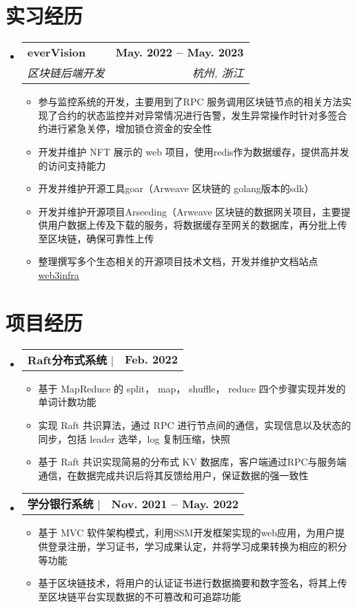 \documentclass[letterpaper,11pt]{ctexart}
\makeatletter
\newcommand{\resumeItem}[1]{
  \item\small{
    {#1 \vspace{-2pt}}
  }
}
\newcommand{\resumeSubheading}[4]{
  \vspace{-2pt}\item
    \begin{tabular*}{1.0\textwidth}[t]{l@{\extracolsep{\fill}}r}
      \textbf{#1} & \textbf{\small #2} \\
      \textit{\small#3} & \textit{\small #4} \\
    \end{tabular*}\vspace{-7pt}
}
\newcommand{\resumeProjectHeading}[2]{
    \item
    \begin{tabular*}{1.001\textwidth}{l@{\extracolsep{\fill}}r}
      \small#1 & \textbf{\small #2}\\
    \end{tabular*}\vspace{-7pt}
}
\newcommand{\resumeSubHeadingListStart}{\begin{itemize}[leftmargin=0.0in, label={}]}
\newcommand{\resumeSubHeadingListEnd}{\end{itemize}}
\newcommand{\resumeItemListStart}{\begin{itemize}}
\newcommand{\resumeItemListEnd}{\end{itemize}\vspace{-5pt}}
\makeatother
\begin{document}
\section{实习经历}
  \resumeSubHeadingListStart

    \resumeSubheading
      {everVision}{May. 2022 -- May. 2023}
      {区块链后端开发}{杭州, 浙江}
      \resumeItemListStart
        \resumeItem{参与监控系统的开发，主要用到了RPC 服务调用区块链节点的相关方法实现了合约的状态监控并对异常情况进行告警，发生异常操作时针对多签合约进行紧急关停，增加锁仓资金的安全性}
        \resumeItem{开发并维护 NFT 展示的 web 项目，使用redis作为数据缓存，提供高并发的访问支持能力}
        \resumeItem{开发并维护开源工具goar（Arweave 区块链的 golang版本的sdk）}
        \resumeItem{开发并维护开源项目Arseeding（Arweave 区块链的数据网关项目，主要提供用户数据上传及下载的服务，将数据缓存至网关的数据库，再分批上传至区块链，确保可靠性上传}
        \resumeItem{整理撰写多个生态相关的开源项目技术文档，开发并维护文档站点 \href{https://web3infra.dev/}{\underline{web3infra}}}
      \resumeItemListEnd

    
  \resumeSubHeadingListEnd
\vspace{-16pt}

\section{项目经历}
    \vspace{-5pt}
    \resumeSubHeadingListStart
          \resumeProjectHeading
          {\textbf{Raft分布式系统} $|$ }{Feb. 2022}
          \resumeItemListStart
            \resumeItem{基于 MapReduce 的 split， map， shuffle， reduce 四个步骤实现并发的单词计数功能}
            \resumeItem{实现 Raft 共识算法，通过 RPC 进行节点间的通信，实现信息以及状态的同步，包括 leader 选举，log 复制压缩，快照}
            \resumeItem{基于 Raft 共识实现简易的分布式 KV 数据库，客户端通过RPC与服务端通信，在数据完成共识后将其反馈给用户，保证数据的强一致性}
          \resumeItemListEnd
    \resumeSubHeadingListEnd
    \vspace{-35pt}
    \resumeSubHeadingListStart
              \resumeProjectHeading
              {\textbf{学分银行系统} $|$ }{Nov. 2021 -- May. 2022}
              \resumeItemListStart
                \resumeItem{基于 MVC 软件架构模式，利用SSM开发框架实现的web应用，为用户提供登录注册，学习证书，学习成果认定，并将学习成果转换为相应的积分等功能}
                \resumeItem{基于区块链技术，将用户的认证证书进行数据摘要和数字签名，将其上传至区块链平台实现数据的不可篡改和可追踪功能}
              \resumeItemListEnd
    \resumeSubHeadingListEnd
\vspace{-15pt}
\end{document}
